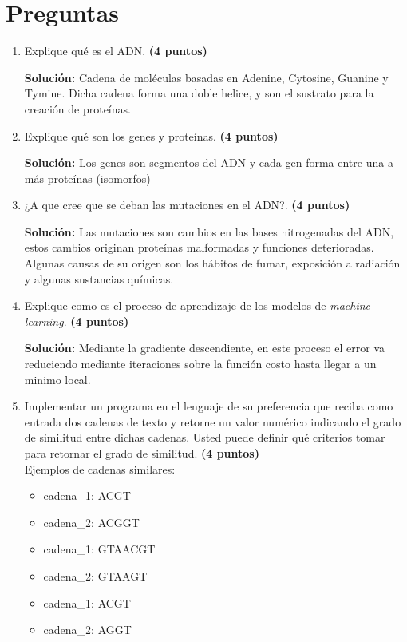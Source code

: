 \documentclass{article}
\begin{document}
	
	
	
	\section*{Preguntas}
	
	\begin{enumerate}
		\item Explique qué es el ADN. \textbf{(4 puntos)}
		
		\textbf{Solución:} Cadena de moléculas basadas en Adenine, Cytosine, Guanine y Tymine. Dicha cadena forma una doble helice, y son el sustrato para la creación de proteínas. 
		
		\item Explique qué son los genes y proteínas. \textbf{(4 puntos)}
		
		\textbf{Solución:}  Los genes son segmentos del ADN y cada gen forma entre una a más proteínas (isomorfos)
		
		
		\item ¿A que cree que se deban las mutaciones en el ADN?. \textbf{(4 puntos)}
		
		\textbf{Solución:} Las mutaciones son cambios en las bases nitrogenadas del ADN, estos cambios originan proteínas malformadas y funciones deterioradas. Algunas causas de su origen son los hábitos de fumar, exposición a radiación y algunas sustancias químicas.
		
		
		\item Explique como es el proceso de aprendizaje de los modelos de \textit{machine learning}. \textbf{(4 puntos)}
		
		\textbf{Solución:} Mediante la gradiente descendiente, en este proceso el error va reduciendo mediante iteraciones sobre la función costo hasta llegar a un minimo local.
		
		\item Implementar un programa en el lenguaje de su preferencia que reciba como entrada dos cadenas de texto y retorne un valor numérico indicando el grado de similitud entre dichas cadenas. Usted puede definir qué criterios tomar para retornar el grado de similitud. \textbf{(4 puntos)}\\
		
		Ejemplos de cadenas similares: 
		\begin{itemize}
			\item 	cadena\_1: ACGT
			\item 	cadena\_2: ACGGT \\
			\item 	cadena\_1: GTAACGT
			\item 	cadena\_2: GTAAGT \\
			\item 	cadena\_1: ACGT
			\item 	cadena\_2: AGGT
		\end{itemize}
	

\end{enumerate}
\end{document}
